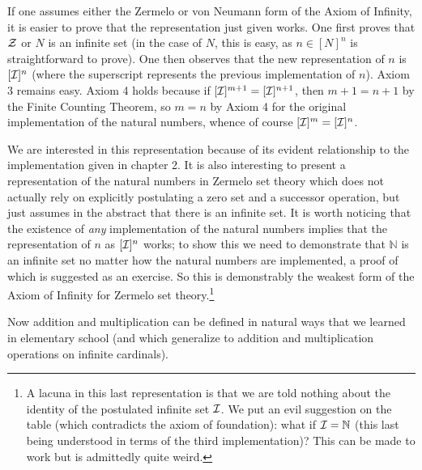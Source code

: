 \documentclass[12pt]{book}
\begin{document}
If one assumes either the Zermelo or von Neumann form of the Axiom of Infinity, it is easier to prove that the representation just given works.
One first proves that $\cal Z$ or $N$ is an infinite set (in the case of $N$, this is easy, as $n \in [N]^n$ is straightforward to prove).  One then observes that the new representation of $n$ is $[{\cal I}]^n$ (where the superscript represents the previous implementation of $n$).  Axiom 3 remains easy.
Axiom 4 holds because if $[{\cal I}]^{m+1}=[{\cal I}]^{n+1}$, then $m+1=n+1$ by the Finite Counting Theorem, so $m=n$ by Axiom 4 for the original implementation of the natural numbers, whence of course $[{\cal I}]^m=[{\cal I}]^n$.

We are interested in this representation because of its evident relationship to the implementation given in chapter 2.  It is also interesting to present a representation of the natural numbers in Zermelo set theory which does not actually rely on explicitly postulating a zero set and a successor operation, but just assumes in the abstract that there is an infinite set.  It is worth noticing that the existence of {\em any\/} implementation of the natural numbers implies that the representation of $n$ as $[{\cal I}]^n$ works;  to show this we need to demonstrate that $\mathbb N$ is an infinite set no matter how the natural numbers are implemented, a proof of which is suggested as an exercise.  So this is demonstrably the weakest form of the Axiom of Infinity for Zermelo set theory.\footnote{A lacuna in this last representation is that we are told nothing about the identity of the postulated infinite set $\cal I$.  We put an evil suggestion on the table (which contradicts the axiom of foundation):  what if ${\cal I} = \mathbb N$ (this last being understood in terms of the third implementation)?  This can be made to work but is admittedly quite weird.}

Now addition and multiplication can be defined in natural ways that we learned in elementary school (and which generalize to addition and multiplication operations on infinite cardinals).
\end{document}
